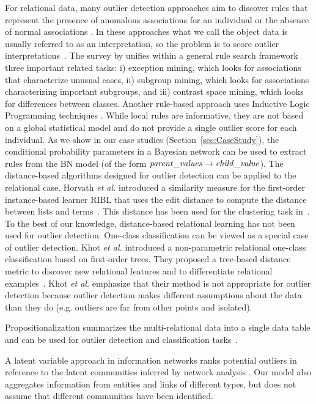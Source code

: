 {				For relational data, many outlier detection approaches aim to discover rules that represent the presence of anomalous associations for an individual or the absence of normal associations \citep{Maervoet2012,Gao2010}.    In these approaches what we call the object data is usually referred to as an interpretation, so the problem is to score outlier interpretations~\citep{Maervoet2012}. The survey by \citep{Novak2009} unifies within a general rule search framework three important related tasks: i) exception mining, which looks for associations that characterize unusual cases, ii) subgroup mining, which looks for associations  characterizing important subgroups, and iii) contrast space mining, which looks for differences between classes. Another rule-based approach uses Inductive Logic Programming techniques \citep{Angiulli2007}.
				While local rules are informative, they are not based on a global statistical model and do not provide a single outlier score for each individual. As we show in our case studies (Section~\ref{sec:CaseStudy}), the conditional probability parameters in a Bayesian network can be used to extract rules  from the BN model (of the form $\it{parent\_values} \rightarrow \it{child\_value}$).
				The distance-based algorithms designed for outlier detection can be applied to the relational case.  Horvath {\em et al.} introduced a similarity measure for the first-order instance-based learner RIBL that uses the edit distance to compute the distance between lists and terms~\citep{Horvath2001}. This distance has been used for the clustering task in~\citep{Kirsten2001}. To the best of our knowledge, distance-based relational learning has not been used for outlier detection. One-class classification can be viewed as a special case of outlier detection.  Khot {\em et al.} introduced a non-parametric relational one-class classification based on first-order trees. They proposed a tree-based distance metric to discover new relational features and to differentiate relational examples~\citep{Khot2014}. Khot {\em et al.} emphasize that their method is not appropriate for outlier detection because outlier detection makes different assumptions about the data than they do (e.g. outliers are far from other points and isolated).  
				
				 Propositionalization summarizes the multi-relational data into a single data table and can be used for outlier detection and classification tasks~\citep{Kramer2000,Lavrac13,kuzelka2008,Riahi2016,AndersonP08}. 
				
				A latent variable approach in information networks ranks potential outliers in reference to the latent communities inferred by network analysis \citep{Gao2010}. Our model also aggregates information from entities and links of different types, but does not assume that different communities have been identified. 
				
}
